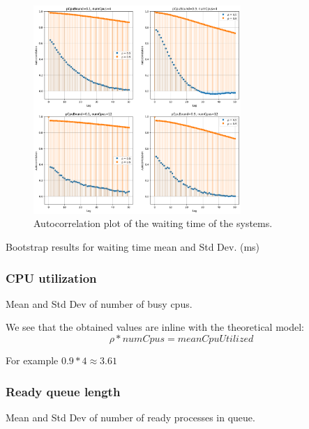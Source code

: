 \begin{figure}[H]
    \captionsetup{type=figure}
    \centering
    \includegraphics[width=0.7\textwidth]{./images/04/fcfs/wait/autocorrelation.png}
    \caption{Autocorrelation plot of the waiting time of the systems.}
    \label{fig:fcfsWaitAutocorrelation}
\end{figure}



\begin{table}[H]
    \centering
    \scriptsize
    
    \caption{Bootstrap results for waiting time mean and Std Dev. (ms)}
    \label{tab:fcfsWait}
\end{table}


\subsubsection{CPU utilization}

\label{sec:fcfsCpuUtilization}

\begin{table}[H]
    \centering
    \scriptsize
    
    \caption{Mean and Std Dev of number of busy cpus.}
    \label{tab:fcfsCpus}
\end{table}

We see that the obtained values are inline with the theoretical model:
\begin{equation}
    \rho * numCpus = meanCpuUtilized
\end{equation}


For example $0.9 * 4 \approx 3.61$ 

\subsubsection{Ready queue length}

\begin{table}[H]
    \centering
    \scriptsize
    
    \caption{Mean and Std Dev of number of ready processes in queue.}
    \label{tab:fcfsReadyProc}
\end{table}
